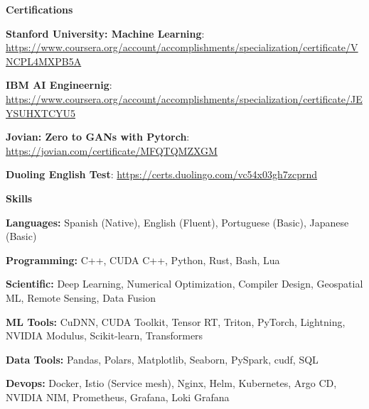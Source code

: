 \documentclass[11pt]{article}
\begin{document}
\begin{center}
    \textbf{Certifications}
\end{center}

\textbf{Stanford University: Machine Learning}: \url{https://www.coursera.org/account/accomplishments/specialization/certificate/VNCPL4MXPB5A}

\textbf{IBM AI Engineernig}: \url{https://www.coursera.org/account/accomplishments/specialization/certificate/JEYSUHXTCYU5}

\textbf{Jovian: Zero to GANs with Pytorch}: \url{https://jovian.com/certificate/MFQTQMZXGM}

\textbf{Duoling English Test}: \url{https://certs.duolingo.com/vc54x03gh7zcprnd}

\begin{center}
    \textbf{Skills}
\end{center}

\textbf{Languages:} Spanish (Native), English (Fluent), Portuguese (Basic), Japanese (Basic)

\textbf{Programming:} C++, CUDA C++, Python, Rust, Bash, Lua

\textbf{Scientific:} Deep Learning, Numerical Optimization, Compiler Design, Geospatial ML, Remote Sensing, Data Fusion

\textbf{ML Tools:} CuDNN, CUDA Toolkit, Tensor RT, Triton, PyTorch, Lightning, NVIDIA Modulus, Scikit-learn, Transformers

\textbf{Data Tools:} Pandas, Polars, Matplotlib, Seaborn, PySpark, cudf, SQL

\textbf{Devops: } Docker, Istio (Service mesh), Nginx, Helm, Kubernetes, Argo CD, NVIDIA NIM, Prometheus, Grafana, Loki Grafana


\end{document}
